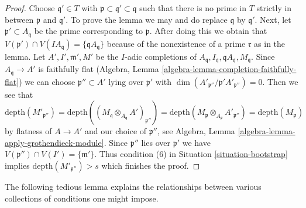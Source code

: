 \begin{proof}
Choose $\mathfrak q' \in T$ with
$\mathfrak p \subset \mathfrak q' \subset \mathfrak q$
such that there is no prime in $T$ strictly
in between $\mathfrak p$ and $\mathfrak q'$. To prove the lemma
we may and do replace $\mathfrak q$ by $\mathfrak q'$.
Next, let $\mathfrak p' \subset A_\mathfrak q$ be the prime corresponding to
$\mathfrak p$. After doing this we obtain that
$V(\mathfrak p') \cap V(IA_\mathfrak q) = \{\mathfrak q A_\mathfrak q\}$
because of the nonexistence of a prime $\mathfrak r$ as in the lemma.
Let $A', I', \mathfrak m', M'$ be the $I$-adic completions of
$A_\mathfrak q, I_\mathfrak q, \mathfrak qA_\mathfrak q, M_\mathfrak q$.
Since $A_\mathfrak q \to A'$ is faithfully flat
(Algebra, Lemma \ref{algebra-lemma-completion-faithfully-flat})
we can choose $\mathfrak p'' \subset A'$ lying over $\mathfrak p'$
with $\dim(A'_{\mathfrak p''}/\mathfrak p' A'_{\mathfrak p''}) = 0$.
Then we see that
$$
\text{depth}(M'_{\mathfrak p''}) =
\text{depth}((M_\mathfrak q \otimes_{A_\mathfrak q} A')_{\mathfrak p''}) =
\text{depth}(M_\mathfrak p \otimes_{A_\mathfrak p} A'_{\mathfrak p''}) =
\text{depth}(M_\mathfrak p)
$$
by flatness of $A \to A'$ and our choice of $\mathfrak p''$, see
Algebra, Lemma \ref{algebra-lemma-apply-grothendieck-module}.
Since $\mathfrak p''$ lies over $\mathfrak p'$ we have
$V(\mathfrak p'') \cap V(I') = \{\mathfrak m'\}$. Thus
condition (6) in Situation \ref{situation-bootstrap} implies
$\text{depth}(M'_{\mathfrak p''}) > s$ which finishes the proof.
\end{proof}

\noindent
The following tedious lemma explains the relationships between various
collections of conditions one might impose.

